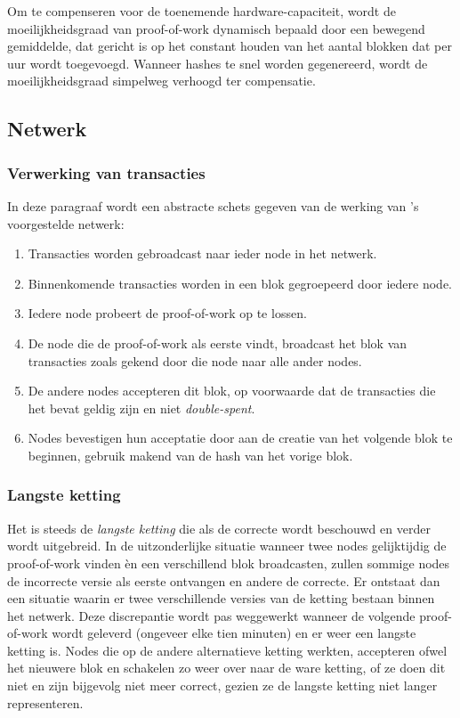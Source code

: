 	Om te compenseren voor de toenemende hardware-capaciteit, wordt de moeilijkheidsgraad van proof-of-work dynamisch bepaald door een bewegend gemiddelde, dat gericht is op het constant houden van het aantal blokken dat per uur wordt toegevoegd. Wanneer hashes te snel worden gegenereerd, wordt de moeilijkheidsgraad simpelweg verhoogd ter compensatie. ~\autocite{Nakamoto2008}
	\subsection{Netwerk}
		\subsubsection{Verwerking  van transacties}
		In deze paragraaf wordt een abstracte schets gegeven van de werking van \textcite{Nakamoto2008}’s voorgestelde netwerk:
		\begin{enumerate}
			\item Transacties worden gebroadcast naar ieder node in het netwerk.
			\item Binnenkomende transacties worden in een blok gegroepeerd door iedere node.
			\item Iedere node probeert de proof-of-work op te lossen.
			\item De node die de proof-of-work als eerste vindt, broadcast het blok van transacties zoals gekend door die node naar alle ander nodes.
			\item De andere nodes accepteren dit blok, op voorwaarde dat de transacties die het bevat geldig zijn en niet \textit{double-spent}.
			\item Nodes bevestigen hun acceptatie door aan de creatie van het volgende blok te beginnen, gebruik makend van de hash van het vorige blok.
		\end{enumerate}
		\subsubsection{Langste ketting}
		Het is steeds de \textit{langste ketting} die als de correcte wordt beschouwd en verder wordt uitgebreid. In de uitzonderlijke situatie wanneer twee nodes gelijktijdig de proof-of-work vinden èn een verschillend blok broadcasten, zullen sommige nodes de incorrecte versie als eerste ontvangen en andere de correcte. Er ontstaat dan een situatie waarin er twee verschillende versies van de ketting bestaan binnen het netwerk. Deze discrepantie wordt pas weggewerkt wanneer de volgende proof-of-work wordt geleverd  (ongeveer elke tien minuten) en er weer een langste ketting is. Nodes die op de andere alternatieve ketting werkten, accepteren ofwel het nieuwere blok en schakelen zo weer over naar de ware ketting, of ze doen dit niet en zijn bijgevolg niet meer correct, gezien ze de langste ketting niet langer representeren. ~\autocite{Nakamoto2008}
